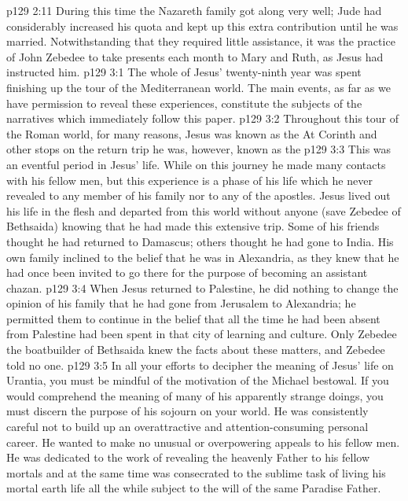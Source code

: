 \vs p129 2:11 \pc During this time the Nazareth family got along very well; Jude had considerably increased his quota and kept up this extra contribution until he was married. Notwithstanding that they required little assistance, it was the practice of John Zebedee to take presents each month to Mary and Ruth, as Jesus had instructed him.
\vs p129 3:1 The whole of Jesus’ twenty\hyp{}ninth year was spent finishing up the tour of the Mediterranean world. The main events, as far as we have permission to reveal these experiences, constitute the subjects of the narratives which immediately follow this paper.
\vs p129 3:2 \pc Throughout this tour of the Roman world, for many reasons, Jesus was known as the  At Corinth and other stops on the return trip he was, however, known as the 
\vs p129 3:3 This was an eventful period in Jesus’ life. While on this journey he made many contacts with his fellow men, but this experience is a phase of his life which he never revealed to any member of his family nor to any of the apostles. Jesus lived out his life in the flesh and departed from this world without anyone (save Zebedee of Bethsaida) knowing that he had made this extensive trip. Some of his friends thought he had returned to Damascus; others thought he had gone to India. His own family inclined to the belief that he was in Alexandria, as they knew that he had once been invited to go there for the purpose of becoming an assistant chazan.
\vs p129 3:4 When Jesus returned to Palestine, he did nothing to change the opinion of his family that he had gone from Jerusalem to Alexandria; he permitted them to continue in the belief that all the time he had been absent from Palestine had been spent in that city of learning and culture. Only Zebedee the boatbuilder of Bethsaida knew the facts about these matters, and Zebedee told no one.
\vs p129 3:5 \pc In all your efforts to decipher the meaning of Jesus’ life on Urantia, you must be mindful of the motivation of the Michael bestowal. If you would comprehend the meaning of many of his apparently strange doings, you must discern the purpose of his sojourn on your world. He was consistently careful not to build up an overattractive and attention\hyp{}consuming personal career. He wanted to make no unusual or overpowering appeals to his fellow men. He was dedicated to the work of revealing the heavenly Father to his fellow mortals and at the same time was consecrated to the sublime task of living his mortal earth life all the while subject to the will of the same Paradise Father.

